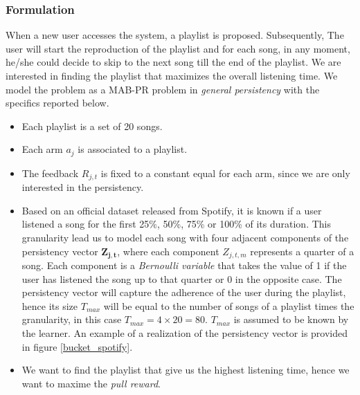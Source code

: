 \subsubsection*{Formulation}
When a new user accesses the system, a playlist is proposed. Subsequently, The user will start the reproduction of the playlist and for each song, in any moment, he/she could decide to skip to the next song till the end of the playlist. We are interested in finding the playlist that maximizes the overall listening time. We model the problem as a MAB-PR problem in \emph{general persistency} with the specifics reported below.
\begin{itemize}
	\item Each playlist is a set of 20 songs.
	\item Each arm $a_j$ is associated to a playlist.
	\item The feedback $R_{j,t}$ is fixed to a constant equal for each arm, since we are only interested in the persistency.
	\item Based on an official dataset released from Spotify, it is known if a user listened a song for the first 25\%, 50\%, 75\% or 100\% of its duration. This granularity lead us to model each song with four adjacent components of the persistency vector $\boldsymbol{Z_{j,t}}$, where each component $Z_{j,t,m}$ represents a quarter of a song. Each component is a \emph{Bernoulli variable} that takes the value of 1 if the user has listened the song up to that quarter or 0 in the opposite case. The persistency vector will capture the adherence of the user during the playlist, hence its size $T_{max}$ will be equal to  the number of songs of a playlist times the granularity, in this case $T_{max} = 4 \times 20 = 80$. $T_{max}$ is assumed to be known by the learner.  An example of a realization of the persistency vector is provided in figure \ref{bucket_spotify}.
	\item We want to find the playlist that give us the highest listening time, hence we want to maxime the \emph{pull reward}.
	
\end{itemize}

